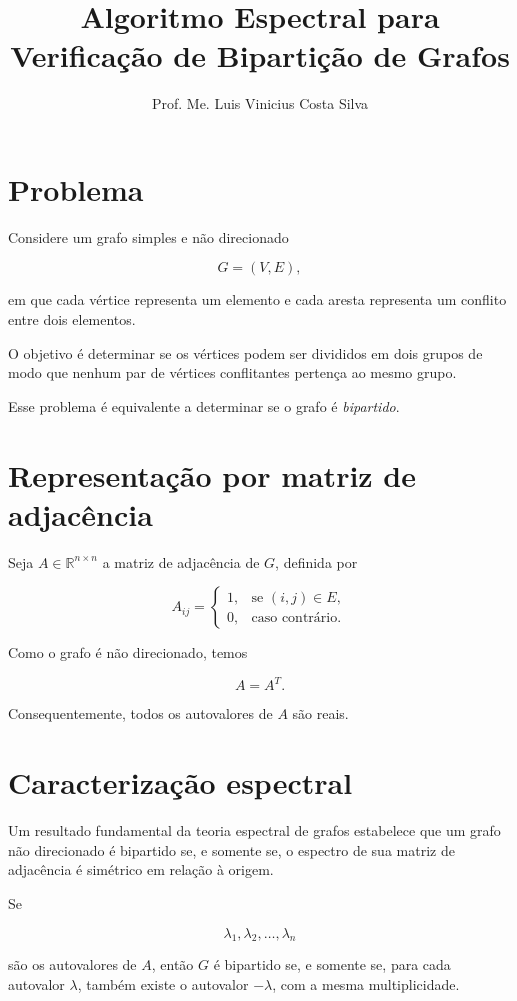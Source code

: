 \documentclass[12pt,a4paper]{article}
\title{Algoritmo Espectral para Verificação de Bipartição de Grafos}
\author{Prof. Me. Luis Vinicius Costa Silva}
\date{}
\begin{document}
\maketitle

\section{Problema}

Considere um grafo simples e não direcionado

$$
G=(V,E),
$$

em que cada vértice representa um elemento e cada aresta representa
um conflito entre dois elementos.

O objetivo é determinar se os vértices podem ser divididos em dois
grupos de modo que nenhum par de vértices conflitantes pertença ao
mesmo grupo.

Esse problema é equivalente a determinar se o grafo é
\emph{bipartido}.

\section{Representação por matriz de adjacência}

Seja $A\in\mathbb{R}^{n\times n}$ a matriz de adjacência de $G$,
definida por

$$
A_{ij} =
\begin{cases}
1, & \text{se } (i,j)\in E,\\
0, & \text{caso contrário}.
\end{cases}
$$

Como o grafo é não direcionado, temos

$$
A=A^T.
$$

Consequentemente, todos os autovalores de $A$ são reais.

\section{Caracterização espectral}

Um resultado fundamental da teoria espectral de grafos estabelece que
um grafo não direcionado é bipartido se, e somente se, o espectro de
sua matriz de adjacência é simétrico em relação à origem.

Se

$$
\lambda_1,\lambda_2,\ldots,\lambda_n
$$

são os autovalores de $A$, então $G$ é bipartido se, e somente se, para
cada autovalor $\lambda$, também existe o autovalor $-\lambda$, com a
mesma multiplicidade.
\end{document}
